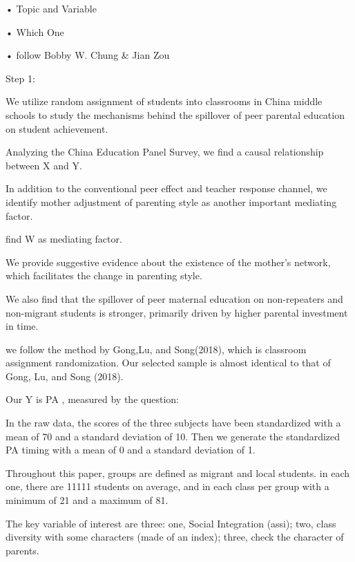 
    • Topic and Variable 
    
    • Which One  
     
    • follow Bobby W. Chung \& Jian Zou

    Step 1:
        
    We utilize random assignment of students into classrooms in China middle schools to study the mechanisms behind the spillover of peer parental education on student achievement. 
    
    Analyzing the China Education Panel Survey, we find a    causal relationship between X and Y. 
    
    In addition to the conventional peer effect and teacher response channel, we identify mother adjustment of parenting style as another important mediating factor. 
    
    find W as mediating factor.
    
    We provide suggestive evidence about the existence of the mother’s network, which facilitates the change in parenting style. 
    
    We also find that the spillover of peer maternal education on non-repeaters and non-migrant students is stronger, primarily driven by higher parental investment in time.
    
we follow the method by Gong,Lu, and Song(2018), which is classroom assignment randomization. Our selected sample is almost identical to that of Gong, Lu, and Song (2018).

Our Y is PA , measured by the question:

In the raw data, the scores of the three subjects have been standardized with a mean of 70 and a standard deviation of 10. Then we generate the standardized PA timing with a mean of 0 and a standard deviation of 1.

Throughout this paper, groups are defined as migrant and local students. in each one, there are 11111 students on average, and in each class per group with a minimum of 21 and a maximum of 81.

The key variable of interest are three: one, Social Integration (assi); two, class diversity with some characters (made of an index); three, check the character of parents.